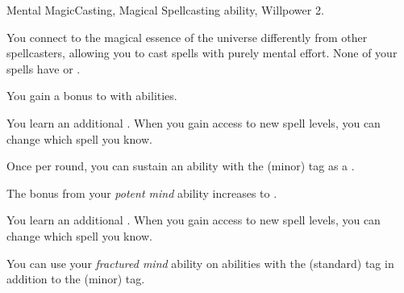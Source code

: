     \begin{feat}{Mental Magic}{Casting, Magical}
        \featpre Spellcasting ability, Willpower 2.

         You connect to the magical essence of the universe differently from other spellcasters, allowing you to cast spells with purely mental effort.
        None of your spells have  or .

         You gain a  bonus to  with  abilities.

         You learn an additional .
        When you gain access to new spell levels, you can change which spell you know.

         Once per round, you can sustain an ability with the  (minor) tag as a .

         The bonus from your \textit{potent mind} ability increases to .

         You learn an additional .
        When you gain access to new spell levels, you can change which spell you know.

         You can use your \textit{fractured mind} ability on abilities with the  (standard) tag in addition to the  (minor) tag.
    \end{feat}

